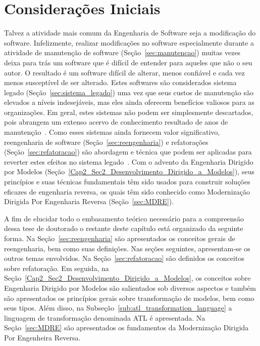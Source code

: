 
\section{Considerações Iniciais}

Talvez a atividade mais comum da Engenharia de Software seja a modificação do software. Infelizmente, realizar modificações no software especialmente durante a atividade de manutenção de software (Seção~\ref{sec:manutencao}) muitas vezes deixa para trás um software que é difícil de entender para aqueles que não o seu autor. 
O resultado é um software difícil de alterar, menos confiável e cada vez menos susceptível de ser alterado. Estes softwares são considerados sistema legado (Seção~\ref{sec:sistema_legado})  uma vez que seus custos de manutenção são elevados a níveis indesejáveis, mas eles ainda oferecem benefícios valiosos para as organizações. Em geral, estes sistemas não podem ser simplesmente descartados, pois abrangem um extenso acervo de conhecimento resultado de anos de manutenção~\cite{Ulrich_2010}. Como esses sistemas ainda fornecem valor significativo, reengenharia de software (Seção~\ref{sec:reengenharia}) e refatorações (Seção~\ref{sec:refatoracao}) são abordagem e técnica que podem ser aplicadas para reverter estes efeitos no sistema legado~\cite{Chikofsky_cross}. Com o advento da Engenharia Dirigido por Modelos (Seção~\ref{Cap2_Sec2_Desenvolvimento_Dirigido_a_Modelos}), seus princípios e suas técnicas fundamentais têm sido usados para construir soluções eficazes de engenharia reversa, os quais têm sido conhecido como Modernização Dirigida Por Engenharia Reversa (Seção~\ref{sec:MDRE}).

A fim de elucidar todo o embasamento teórico necessário para a compreensão dessa tese de doutorado o restante deste capítulo está organizado da seguinte forma. 
%
%
%
%
Na Seção~\ref{sec:reengenharia} são apresentados os conceitos gerais de reengenharia, bem como suas definições. Nas seções seguintes, apresentam-se os outros temas envolvidos. Na Seção~\ref{sec:refatoracao} são definidos os conceitos sobre refatoração. Em seguida, na Seção~\ref{Cap2_Sec2_Desenvolvimento_Dirigido_a_Modelos}, os conceitos sobre Engenharia Dirigido por Modelos são salientados sob diversos aspectos e também são apresentados os princípios gerais sobre transformação de modelos, bem como seus tipos. Além disso, na Subseção~\ref{sub:atl_transformation_language} a linguagem de transformação denominada ATL é apresentada. Na Seção~\ref{sec:MDRE} são apresentados os fundamentos da Modernização Dirigida Por Engenheira Reversa.

